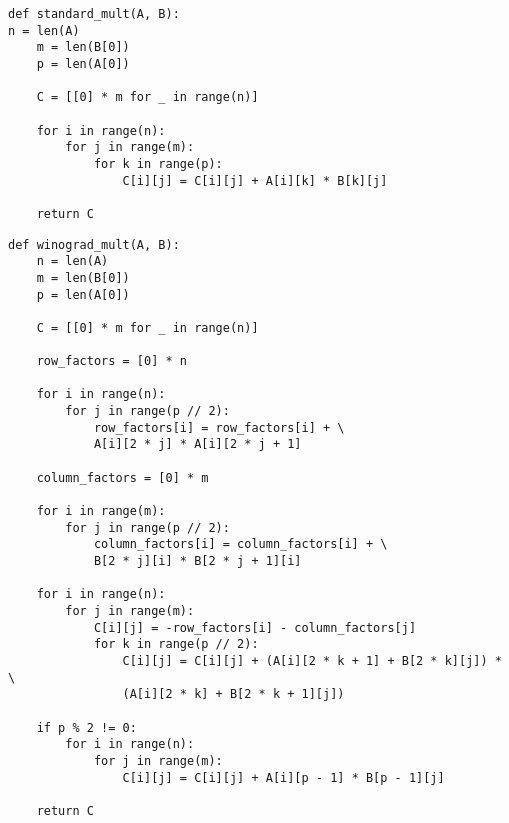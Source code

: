 \begin{center}
\captionsetup{justification=raggedright,singlelinecheck=off}
\begin{lstlisting}[label=lst:standard,caption=Стандартный алгоритм умножения матриц]
def standard_mult(A, B):
n = len(A)
	m = len(B[0])
	p = len(A[0])
	
	C = [[0] * m for _ in range(n)]
	
	for i in range(n):
		for j in range(m):
			for k in range(p):
				C[i][j] = C[i][j] + A[i][k] * B[k][j]
	
	return C
\end{lstlisting} 
\end{center}
\clearpage
\begin{center}
\captionsetup{justification=raggedright,singlelinecheck=off}
\begin{lstlisting}[label=lst:winograd,caption=Алгоритм Винограда умножения матриц]
def winograd_mult(A, B):
	n = len(A)
	m = len(B[0])
	p = len(A[0])
	
	C = [[0] * m for _ in range(n)]
	
	row_factors = [0] * n
	
	for i in range(n):
		for j in range(p // 2):
			row_factors[i] = row_factors[i] + \
			A[i][2 * j] * A[i][2 * j + 1]
	
	column_factors = [0] * m
	
	for i in range(m):
		for j in range(p // 2):
			column_factors[i] = column_factors[i] + \
			B[2 * j][i] * B[2 * j + 1][i]
	
	for i in range(n):
		for j in range(m):
			C[i][j] = -row_factors[i] - column_factors[j]
			for k in range(p // 2):
				C[i][j] = C[i][j] + (A[i][2 * k + 1] + B[2 * k][j]) * \
				(A[i][2 * k] + B[2 * k + 1][j])
	
	if p % 2 != 0:
		for i in range(n):
			for j in range(m):
				C[i][j] = C[i][j] + A[i][p - 1] * B[p - 1][j]
	
	return C
\end{lstlisting}
\end{center}
\clearpage
